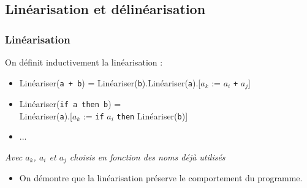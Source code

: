\subsection{Linéarisation et délinéarisation}

\begin{frame}[t]
    \frametitle{Linéarisation}

    On définit inductivement la linéarisation :

    \begin{itemize}
        \pause
        \item Linéariser(\texttt{a + b}) = Linéariser(\texttt{b}).Linéariser(\texttt{a}).[$a_k$ := $a_i$ \texttt{+} $a_j$] \\
              \pause
        \item Linéariser(\texttt{if a then b}) = \\
              \hspace{0.5cm} Linéariser(\texttt{a}).[$a_k$ := \texttt{if} $a_i$ \texttt{then} Linéariser(\texttt{b})]
              \pause
        \item ...
    \end{itemize}
    \small \textit{Avec $a_k$, $a_i$ et $a_j$ choisis en fonction des noms déjà utilisés}

    \pause

    \vspace{1cm}

    \normalsize

    \begin{itemize}
        \item On démontre que la linéarisation préserve le comportement du
              programme.
    \end{itemize}
\end{frame}

